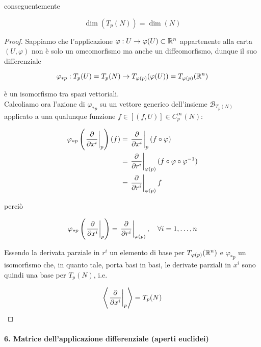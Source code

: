 conseguentemente

\begin{equation}
	\dim(T_{p}(N)) = \dim(N)
\end{equation}

\begin{proof}
	Sappiamo che l'applicazione $ \varphi : U \to \varphi(U) \subset \mathbb{R}^{n} $ appartenente alla carta $ (U,\varphi) $ non è solo un omeomorfismo ma anche un diffeomorfismo, dunque il suo differenziale
	
	\begin{equation}
		\varphi_{*p} : T_{p}(U) = T_{p}(N) \to T_{\varphi(p)}(\varphi(U)) = T_{\varphi(p)}(\mathbb{R}^{n})
	\end{equation}

	è un isomorfismo tra spazi vettoriali. \\
	Calcoliamo ora l'azione di $ \varphi_{*p} $ su un vettore generico dell'insieme $ \mathcal{B}_{T_{p}(N)} $ applicato a una qualunque funzione $ f \in [(f,U)] \in C_{p}^{\infty}(N) $:
	
	\begin{align}
		\begin{split}
			\varphi_{*p} \left( \eval{ \pdv{x^{i}} }_{p} \right) (f) &= \eval{ \pdv{x^{i}} }_{p} (f \circ \varphi) \\
			&= \eval{ \pdv{r^{i}} }_{\varphi(p)} (f \circ \varphi \circ \varphi^{-1}) \\
			&= \eval{ \pdv{r^{i}} }_{\varphi(p)} f
		\end{split}
	\end{align}

	perciò
	
	\begin{equation}
		\varphi_{*p} \left( \eval{ \pdv{x^{i}} }_{p} \right) = \eval{ \pdv{r^{i}} }_{\varphi(p)} \qcomma \forall i=1,\dots,n
	\end{equation}

	Essendo la derivata parziale in $ r^{i} $ un elemento di base per $ T_{\varphi(p)}(\mathbb{R}^{n}) $ e $ \varphi_{*p} $ un isomorfismo che, in quanto tale, porta basi in basi, le derivate parziali in $ x^{i} $ sono quindi una base per $ T_{p}(N) $, i.e.
	
	\begin{equation}
		\ev{ \eval{ \pdv{x^{i}} }_{p} } = T_{p}(N)
	\end{equation}
\end{proof}

\paragraph{6. Matrice dell'applicazione differenziale (aperti euclidei)}

